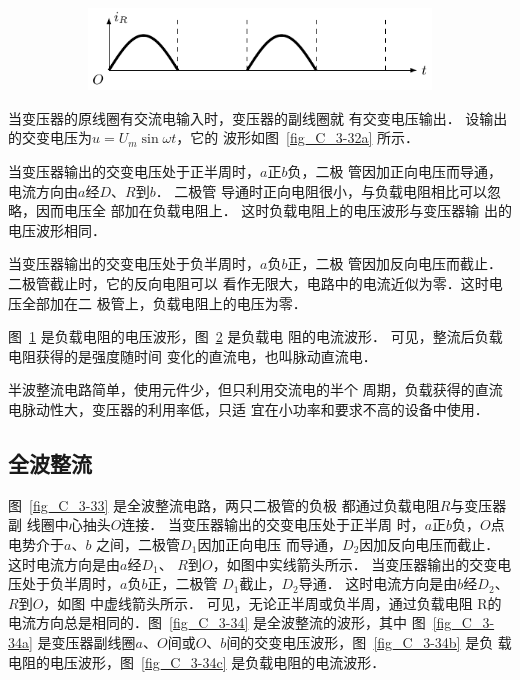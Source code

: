 \begin{figure}[htbp]
\begin{minipage}[b]{0.54\linewidth}
\begin{subfigure}{0.99\linewidth}
    		\caption{}\label{fig_C_3-32b}
    	\end{subfigure}
    	\\
    	\begin{subfigure}{0.99\linewidth}
    		\centering
    		\includegraphics{fig/C/3-32c.pdf}
    		\caption{}\label{fig_C_3-32c}
    	\end{subfigure}
    	\caption{}\label{fig_C_3-32}
    \end{minipage}
\end{figure}

当变压器的原线圈有交流电输入时，变压器的副线圈就
有交变电压输出．
设输出的交变电压为$u=U_m\sin\omega t$，它的
波形如图~\ref{fig_C_3-32a} 所示．


当变压器输出的交变电压处于正半周时，$a$正$b$负，二极
管因加正向电压而导通，电流方向由$a$经$D$、$R$到$b$．
二极管
导通时正向电阻很小，与负载电阻相比可以忽略，因而电压全
部加在负载电阻上．
这时负载电阻上的电压波形与变压器输
出的电压波形相同．

当变压器输出的交变电压处于负半周时，$a$负$b$正，二极
管因加反向电压而截止．
二极管截止时，它的反向电阻可以
看作无限大，电路中的电流近似为零．这时电压全部加在二
极管上，负载电阻上的电压为零．

图~\ref{fig_C_3-32b} 是负载电阻的电压波形，图~\ref{fig_C_3-32c} 是负载电
阻的电流波形．
可见，整流后负载电阻获得的是强度随时间
变化的直流电，也叫脉动直流电．

半波整流电路简单，使用元件少，但只利用交流电的半个
周期，负载获得的直流电脉动性大，变压器的利用率低，只适
宜在小功率和要求不高的设备中使用．

\subsection{全波整流}


图~\ref{fig_C_3-33} 是全波整流电路，两只二极管的负极
都通过负载电阻$R$与变压器副
线圈中心抽头$O$连接．
当变压器输出的交变电压处于正半周
时，$a$正$b$负，$O$点电势介于$a$、$b$
之间，二极管$D_1$因加正向电压
而导通，$D_2$因加反向电压而截止．
这时电流方向是由$a$经$D_1$、
$R$到$O$，如图中实线箭头所示．
当变压器输出的交变电压处于负半周时，$a$负$b$正，二极管
$D_1$截止，$D_2$导通．
这时电流方向是由$b$经$D_2$、$R$到$O$，如图
中虚线箭头所示．
可见，无论正半周或负半周，通过负载电阻
R的电流方向总是相同的．图~\ref{fig_C_3-34} 是全波整流的波形，其中
图~\ref{fig_C_3-34a} 是变压器副线圈$a$、$O$间或$O$、$b$间的交变电压波形，图~\ref{fig_C_3-34b} 是负
载电阻的电压波形，图~\ref{fig_C_3-34c} 是负载电阻的电流波形．

